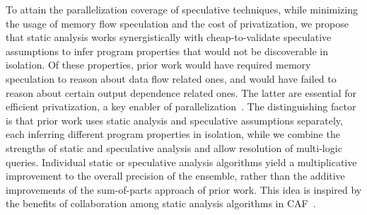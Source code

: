 To attain the parallelization coverage of speculative techniques, while
minimizing the usage of memory flow speculation and the cost of privatization,
we propose that static analysis works synergistically with cheap-to-validate
speculative assumptions to infer program properties that would not be
discoverable in isolation.
%
Of these properties, prior work would have required memory speculation to reason
about data flow related ones, and would have failed to reason about certain
output dependence related ones. The latter are essential for efficient
privatization, a key enabler of
parallelization~\cite{7,21,22,29,32_from_privateer}.
%
The distinguishing factor is that prior work uses static analysis and
speculative assumptions separately, each inferring different program properties
in isolation, while we combine the strengths of static and speculative analysis
and allow resolution of multi-logic queries.
%
Individual static or speculative analysis algorithms yield a multiplicative
improvement to the overall precision of the ensemble, rather than the additive
improvements of the sum-of-parts approach of prior work.
%
This idea is inspired by the benefits of collaboration among static analysis
algorithms in CAF~\cite{johnson:17:cgo}.


%
%
%

